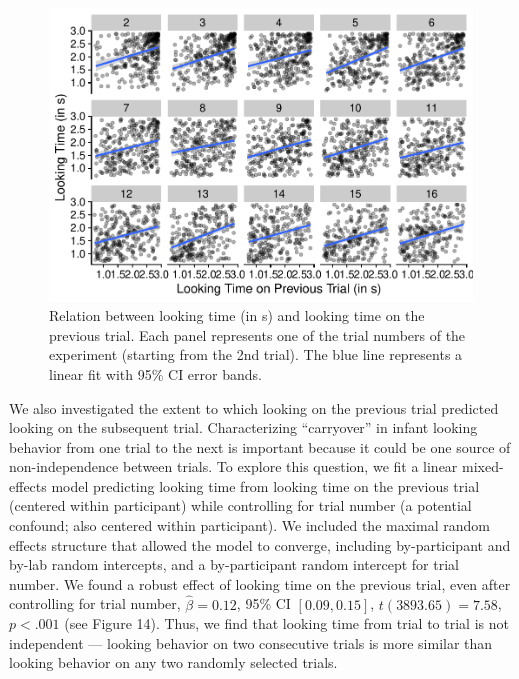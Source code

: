 \documentclass[
  man, donotrepeattitle,floatsintext]{apa6}
\begin{document}
\begin{figure}

{\centering \includegraphics{MB1T_supplement_files/figure-latex/fig14-1} 

}

\caption{Relation between looking time (in s) and looking time on the previous trial. Each panel represents one of the trial numbers of the experiment (starting from the 2nd trial). The blue line represents a linear fit with 95\% CI error bands.}\label{fig:fig14}
\end{figure}

We also investigated the extent to which looking on the previous trial predicted looking on the subsequent trial.
Characterizing ``carryover'' in infant looking behavior from one trial to the next is important because it could be one source of non-independence between trials.
To explore this question, we fit a linear mixed-effects model predicting looking time from looking time on the previous trial (centered within participant) while controlling for trial number (a potential confound; also centered within participant).
We included the maximal random effects structure that allowed the model to converge, including by-participant and by-lab random intercepts, and a by-participant random intercept for trial number.
We found a robust effect of looking time on the previous trial, even after controlling for trial number,
\(\hat{\beta} = 0.12\), 95\% CI \([0.09, 0.15]\), \(t(3893.65) = 7.58\), \(p < .001\) (see Figure 14).
Thus, we find that looking time from trial to trial is not independent --- looking behavior on two consecutive trials is more similar than looking behavior on any two randomly selected trials.
\end{document}
